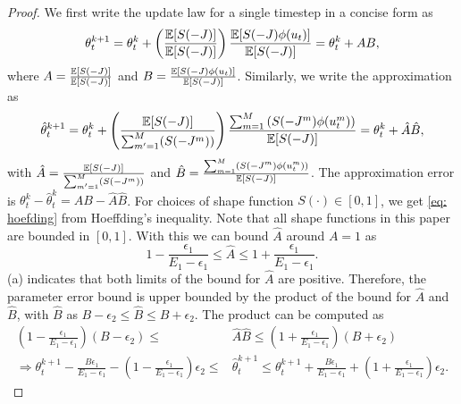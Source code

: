\documentclass[twoside,11pt]{article}
\begin{document}
\begin{proof}
We first write the update law for a single timestep in a concise form as
\begin{equation}
\theta^{k+1}_t = \theta^k_t + \left(\frac{\mathbb{E}[S(-J)]}{\mathbb{E}[S(-J)]}\right)\frac{\mathbb{E}[S(-J)\phi(u_t)]}{\mathbb{E}[S(-J)]}=\theta^k_t + AB,
\end{equation}
where $A=\frac{\mathbb{E}[S(-J)]}{\mathbb{E}[S(-J)]}$ and $B=\frac{\mathbb{E}[S(-J)\phi(u_t)]}{\mathbb{E}[S(-J)]}$. Similarly, we write the approximation as
\begin{equation}
\hat{\theta}_t^{k+1} = \theta^k_t + \left(\frac{\mathbb{E}[S(-J)]}{\sum_{m'=1}^M( S(-J^m))}\right)\frac{\sum^M_{m=1}\left(S(-J^m)\phi(u_t^m)\right)}{\mathbb{E}[S(-J)]} = \theta^k_t + \hat{A}\hat{B},
\end{equation}
with $\hat{A}=\frac{\mathbb{E}[S(-J)]}{\sum_{m'=1}^M( S(-J^m))}$ and $\hat{B}=\frac{\sum^M_{m=1}\left(S(-J^m)\phi(u_t^m)\right)}{\mathbb{E}[S(-J)]}$. The approximation error is $\theta_t^k - \hat{\theta}^k_t=AB - \hat{A}\hat{B}$. For choices of shape function $S(\cdot)\in[0,1]$, we get \eqref{eq: hoefding} from Hoeffding's inequality. Note that all shape functions in this paper are bounded in $[0,1]$. With this we can bound $\hat{A}$ around $A=1$ as
\begin{equation}
1-\frac{\epsilon_1}{E_1-\epsilon_1}\leq \hat{A} \leq 1+\frac{\epsilon_1}{E_1-\epsilon_1}.
\end{equation}
(a) indicates that both limits of the bound for $\hat{A}$ are positive. Therefore, the parameter error bound is upper bounded by the product of the bound for $\hat{A}$ and $\hat{B}$, with $\hat{B}$ as $B-\epsilon_2\leq \hat{B}\leq B+\epsilon_2 $. The product can be computed as
\begin{align*}
\left(1-\frac{\epsilon_1}{E_1-\epsilon_1}\right)\left(B-\epsilon_2\right)\leq &\hat{A}\hat{B}\leq \left(1+\frac{\epsilon_1}{E_1-\epsilon_1}\right)\left(B+\epsilon_2\right)\\
\Rightarrow \theta^{k+1}_t - \frac{B\epsilon_1}{E_1-\epsilon_1}-\left(1-\frac{\epsilon_1}{E_1-\epsilon_1}\right)\epsilon_2\leq &\hat{\theta}^{k+1}_t \leq \theta^{k+1}_t + \frac{B\epsilon_1}{E_1-\epsilon_1}+\left(1+\frac{\epsilon_1}{E_1-\epsilon_1}\right)\epsilon_2.
\end{align*}
\end{proof}
\end{document}
